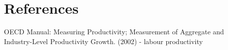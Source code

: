 \documentclass[Masters.tex]{subfiles}
\begin{document}
\chapter{References}
OECD Manual: Measuring Productivity; Measurement of Aggregate and Industry-Level Productivity Growth. (2002) - labour productivity
\end{document}
